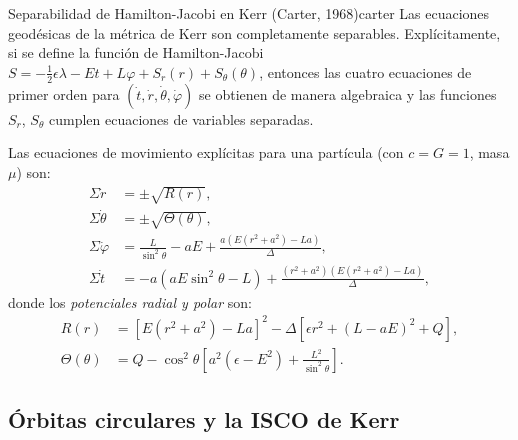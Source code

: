 \begin{teorema}{Separabilidad de Hamilton-Jacobi en Kerr (Carter, 1968)}{carter}
Las ecuaciones geodésicas de la métrica de Kerr son completamente separables. Explícitamente, si se define la función de Hamilton-Jacobi $S = -\tfrac{1}{2}\epsilon\lambda - Et + L\varphi + S_r(r) + S_\theta(\theta)$, entonces las cuatro ecuaciones de primer orden para $(\dot{t}, \dot{r}, \dot{\theta}, \dot{\varphi})$ se obtienen de manera algebraica y las funciones $S_r$, $S_\theta$ cumplen ecuaciones de variables separadas.
\end{teorema}

Las ecuaciones de movimiento explícitas para una partícula (con $c = G = 1$, masa $\mu$) son:
\begin{align}
  \Sigma\dot{r}      &= \pm\sqrt{R(r)}, \label{eq:rdot_kerr}\\
  \Sigma\dot{\theta} &= \pm\sqrt{\Theta(\theta)}, \label{eq:thetadot_kerr}\\
  \Sigma\dot{\varphi}&= \frac{L}{\sin^2\!\theta} - aE + \frac{a(E(r^2+a^2)-La)}{\Delta}, \label{eq:phidot_kerr}\\
  \Sigma\dot{t}      &= -a(aE\sin^2\!\theta - L) + \frac{(r^2+a^2)(E(r^2+a^2)-La)}{\Delta}, \label{eq:tdot_kerr}
\end{align}
donde los \emph{potenciales radial y polar} son:
\begin{align}
  R(r)            &= \left[E(r^2+a^2) - La\right]^2 - \Delta\left[\epsilon r^2 + (L-aE)^2 + Q\right], \label{eq:R_kerr}\\
  \Theta(\theta)  &= Q - \cos^2\!\theta\!\left[a^2(\epsilon-E^2) + \frac{L^2}{\sin^2\!\theta}\right]. \label{eq:Theta_kerr}
\end{align}

\subsection{Órbitas circulares y la ISCO de Kerr}

